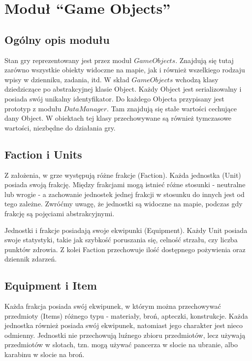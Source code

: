 \documentclass[licencjacka]{pracamgr}
\begin{document}
  \section{Moduł ``Game Objects''}
    \subsection{Ogólny opis modułu}
      Stan gry reprezentowany jest przez moduł $GameObjects$. Znajdują się tutaj zarówno wszystkie obiekty widoczne na
      mapie, jak i również wszelkiego rodzaju wpisy w dzienniku, zadania, itd. W skład $GameObjects$ wchodzą klasy
      dziedziczące po abstrakcyjnej klasie Object. Każdy Object jest serializowalny i posiada swój unikalny
      identyfikator. Do każdego Objecta przypisany jest prototyp z modułu $DataManager$. Tam znajdują się stałe
      wartości cechujące dany Object. W obiektach tej klasy przechowywane są również tymczasowe wartości, niezbędne
      do działania gry.

    \subsection{Faction i Units}
      Z założenia, w grze występują różne frakcje (Faction). Każda jednostka (Unit) posiada swoją frakcję. Między
      frakcjami mogą istnieć różne stosunki - neutralne lub wrogie - a zachowanie jednostek jednej frakcji w stosunku
      do innych jest od tego zależne. Zwróćmy uwagę, że jednostki są widoczne na mapie, podczas gdy frakcję są
      pojęciami abstrakcyjnymi.

      Jednostki i frakcje posiadają swoje ekwipunki (Equipment). Każdy Unit posiada swoje statystyki, takie jak
      szybkość poruszania się, celność strzału, czy liczba punktów zdrowia. Z kolei Faction przechowuje ilość
      dostępnego pożywienia oraz dziennik zdarzeń.

    \subsection{Equipment i Item}
      Każda frakcja posiada swój ekwipunek, w którym można przechowywać przedmioty (Items) różnego typu - materiały,
      broń, apteczki, konstrukcje. Każda jednostka również posiada swój ekwipunek, natomiast jego charakter jest nieco
      odmienny. Jednostki nie przechowują luźnego zbioru przedmiotów, lecz używają przedmiotów w slotach, tzn. mogą
      używać pancerza w slocie na ubranie, albo karabinu w slocie na broń.
\end{document}
